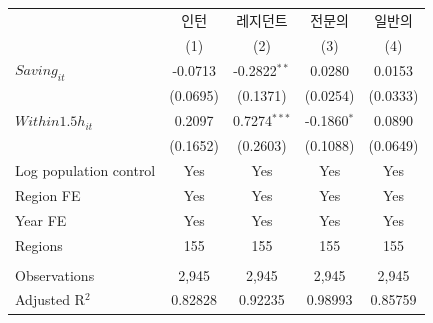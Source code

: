 \begingroup
\centering
\begin{tabular}{lcccc}
   \toprule
                          & 인턴     & 레지던트       & 전문의        & 일반의 \\   
                          & (1)      & (2)            & (3)           & (4)\\  
   \midrule 
   $Saving_{it}$          & -0.0713  & -0.2822$^{**}$ & 0.0280        & 0.0153\\   
                          & (0.0695) & (0.1371)       & (0.0254)      & (0.0333)\\   
   $Within1.5h_{it}$      & 0.2097   & 0.7274$^{***}$ & -0.1860$^{*}$ & 0.0890\\   
                          & (0.1652) & (0.2603)       & (0.1088)      & (0.0649)\\   
   Log population control & Yes      & Yes            & Yes           & Yes\\  
   Region FE              & Yes      & Yes            & Yes           & Yes\\  
   Year FE                & Yes      & Yes            & Yes           & Yes\\  
   Regions                & 155      & 155            & 155           & 155\\  
    \\
   Observations           & 2,945    & 2,945          & 2,945         & 2,945\\  
   Adjusted R$^2$         & 0.82828  & 0.92235        & 0.98993       & 0.85759\\  
   \bottomrule
\end{tabular}
\par\endgroup
